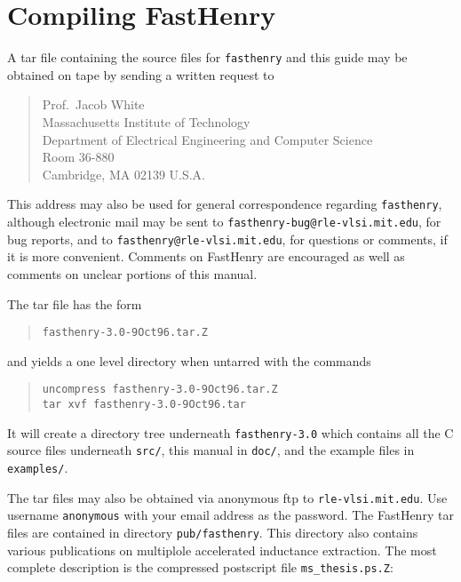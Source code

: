 %
%
\section{Compiling FastHenry}
\label{comfas}


A tar file containing the source files for {\tt fasthenry} and this
guide may be obtained on tape by sending a written request to
\begin{quote}
Prof.\ Jacob White\\
Massachusetts Institute of Technology\\
Department of Electrical Engineering and Computer Science\\
Room 36-880\\
Cambridge, MA 02139 U.S.A.
\end{quote}
This address may also be used for  general correspondence regarding 
{\tt fasthenry}, although electronic mail may be sent to
{\tt fasthenry-bug@rle-vlsi.mit.edu}, 
for bug reports, and to {\tt fasthenry@rle-vlsi.mit.edu}, for
questions or comments, if it is more convenient.  Comments on
FastHenry are encouraged as well as comments on unclear portions of
this manual.

The tar file has the form
\begin{quote}
\begin{verbatim}
fasthenry-3.0-9Oct96.tar.Z
\end{verbatim}
\end{quote}
and yields a one level directory when untarred with the commands
\begin{quote}
\begin{verbatim}
uncompress fasthenry-3.0-9Oct96.tar.Z
tar xvf fasthenry-3.0-9Oct96.tar
\end{verbatim}
\end{quote}
It will create a directory tree underneath {\tt fasthenry-3.0} which 
contains all the C source files underneath {\tt src/}, this manual in
{\tt doc/}, and the example files in {\tt examples/}.

The tar files may
also be obtained via anonymous ftp to {\tt rle-vlsi.mit.edu}.  Use
username {\tt anonymous} with your email address as the password.  The
FastHenry tar files are contained in directory {\tt pub/fasthenry}.
This directory also contains various publications on multiplole
accelerated inductance extraction.  The most complete description is 
the compressed postscript file {\tt ms\_thesis.ps.Z}:

